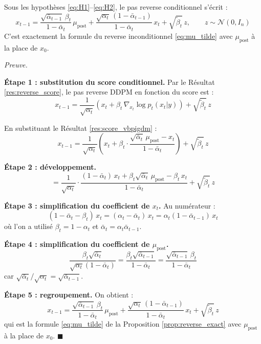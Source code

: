 \documentclass[12pt]{article}
\renewcommand{\qedsymbol}{$\blacksquare$}
\renewenvironment{proof}[1][\proofname]{%
  \par\medskip\noindent
  \textit{\color{proofgray}#1.}\enspace\ignorespaces
}{\hfill\qedsymbol\par\medskip}
\renewcommand{\proofname}{Preuve}
\begin{document}
\begin{resultbox}
\label{res:reverse_cond}
Sous les hypothèses \ref{eq:H1}--\ref{eq:H2}, le pas reverse conditionnel s'écrit :
\begin{equation}
    \boxed{x_{t-1} = \frac{\sqrt{\bar{\alpha}_{t-1}}\, \beta_t}{1 - \bar{\alpha}_t}\, \mu_{\text{post}} + \frac{\sqrt{\alpha_t}\,(1 - \bar{\alpha}_{t-1})}{1 - \bar{\alpha}_t}\, x_t + \sqrt{\tilde{\beta}_t}\, z, \qquad z \sim \mathcal{N}(0, I_n)}
    \label{eq:reverse_cond}
\end{equation}
C'est exactement la formule du reverse inconditionnel \eqref{eq:mu_tilde} avec $\mu_{\text{post}}$ à la place de $x_0$.
\end{resultbox}

\begin{proof}
\textbf{Étape 1 : substitution du score conditionnel.} Par le Résultat \ref{res:reverse_score}, le pas reverse DDPM en fonction du score est :
\[
x_{t-1} = \frac{1}{\sqrt{\alpha_t}}\left(x_t + \beta_t\, \nabla_{x_t} \log p_t(x_t | y)\right) + \sqrt{\tilde{\beta}_t}\, z
\]

En substituant le Résultat \ref{res:score_vbpigdm} :
\[
x_{t-1} = \frac{1}{\sqrt{\alpha_t}}\left(x_t + \beta_t \cdot \frac{\sqrt{\bar{\alpha}_t}\, \mu_{\text{post}} - x_t}{1 - \bar{\alpha}_t}\right) + \sqrt{\tilde{\beta}_t}\, z
\]

\textbf{Étape 2 : développement.}
\[
= \frac{1}{\sqrt{\alpha_t}} \cdot \frac{(1-\bar{\alpha}_t)\, x_t + \beta_t \sqrt{\bar{\alpha}_t}\, \mu_{\text{post}} - \beta_t\, x_t}{1 - \bar{\alpha}_t} + \sqrt{\tilde{\beta}_t}\, z
\]

\textbf{Étape 3 : simplification du coefficient de $x_t$.} Au numérateur :
\[
(1-\bar{\alpha}_t - \beta_t)\, x_t = (\alpha_t - \bar{\alpha}_t)\, x_t = \alpha_t(1 - \bar{\alpha}_{t-1})\, x_t
\]
où l'on a utilisé $\beta_t = 1 - \alpha_t$ et $\bar{\alpha}_t = \alpha_t \bar{\alpha}_{t-1}$.

\textbf{Étape 4 : simplification du coefficient de $\mu_{\text{post}}$.}
\[
\frac{\beta_t \sqrt{\bar{\alpha}_t}}{\sqrt{\alpha_t}(1-\bar{\alpha}_t)} = \frac{\beta_t \sqrt{\bar{\alpha}_{t-1}}}{1-\bar{\alpha}_t} = \frac{\sqrt{\bar{\alpha}_{t-1}}\, \beta_t}{1-\bar{\alpha}_t}
\]
car $\sqrt{\bar{\alpha}_t} / \sqrt{\alpha_t} = \sqrt{\bar{\alpha}_{t-1}}$.

\textbf{Étape 5 : regroupement.} On obtient :
\[
x_{t-1} = \frac{\sqrt{\bar{\alpha}_{t-1}}\, \beta_t}{1-\bar{\alpha}_t}\, \mu_{\text{post}} + \frac{\sqrt{\alpha_t}\,(1-\bar{\alpha}_{t-1})}{1-\bar{\alpha}_t}\, x_t + \sqrt{\tilde{\beta}_t}\, z
\]
qui est la formule \eqref{eq:mu_tilde} de la Proposition \ref{prop:reverse_exact} avec $\mu_{\text{post}}$ à la place de $x_0$.
\end{proof}
\end{document}

